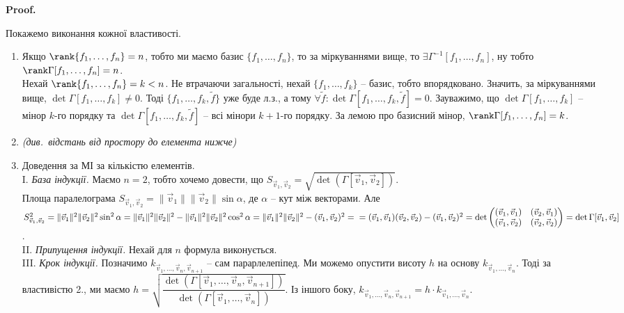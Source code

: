 \documentclass[a4paper, 10pt]{article}
\makeatletter
\theoremstyle{theoremdd}
\renewenvironment{proof}[1][Proof.\\]{\par
\pushQED{\hfill \qed}%
\normalfont \topsep6\p@\@plus6\p@\relax
\trivlist
\item\relax
{\bfseries
#1\@addpunct{.}}\hspace\labelsep\ignorespaces
}{%
\popQED\endtrivlist\@endpefalse
}
\makeatother
\begin{document}
\begin{proof}
Покажемо виконання кожної властивості.
\begin{enumerate}[wide=0pt, label={\arabic*)},topsep=-\parskip]
\item Якщо $\rank\{f_1,\dots,f_n\} = n$, тобто ми маємо базис $\{f_1,\dots,f_n\}$, то за міркуваннями вище, то $\exists \Gamma^{-1}[f_1,\dots,f_n]$, ну тобто $\rank\Gamma[f_1,\dots,f_n] = n$.\\
Нехай $\rank\{f_1,\dots,f_n\} = k < n$. Не втрачаючи загальності, нехай $\{f_1,\dots,f_k\}$ -- базис, тобто впорядковано. Значить, за міркуваннями вище, $\det \Gamma[f_1,\dots,f_k] \neq 0$. Тоді $\{f_1,\dots,f_k,\widetilde{f}\}$ уже буде л.з., а тому $\forall \widetilde{f}: \det \Gamma[f_1,\dots,f_k,\widetilde{f}] = 0$. Зауважимо, що $\det \Gamma[f_1,\dots,f_k]$ -- мінор $k$-го порядку та $\det \Gamma[f_1,\dots,f_k, \widetilde{f}]$ -- всі мінори $k+1$-го порядку. За лемою про базисний мінор, $\rank \Gamma[f_1,\dots,f_n] = k$.
\item \textit{(див.\ відстань від простору до елемента нижче)}
\item Доведення за МІ за кількістю елементів.\\
I. \textit{База індукції.} Маємо $n = 2$, тобто хочемо довести, що $S_{\vec{v}_1,\vec{v}_2} = \sqrt{\det(\Gamma[\vec{v}_1,\vec{v}_2])}$.\\
Площа паралелограма $S_{\vec{v}_1,\vec{v}_2} = \| \vec{v}_1 \| \| \vec{v}_2 \| \sin \alpha$, де $\alpha$ -- кут між векторами. Але\\
$S^2_{\vec{v}_1,\vec{v}_2} = \| \vec{v}_1 \|^2 \| \vec{v}_2 \|^2 \sin^2 \alpha = \| \vec{v}_1 \|^2 \| \vec{v}_2 \|^2 - \| \vec{v}_1 \|^2 \| \vec{v}_2 \|^2 \cos^2 \alpha = \| \vec{v}_1 \|^2 \| \vec{v}_2 \|^2 - (\vec{v}_1,\vec{v}_2)^2 = \\ = (\vec{v}_1,\vec{v}_1) (\vec{v}_2,\vec{v}_2) - (\vec{v}_1,\vec{v}_2)^2 = \det \begin{pmatrix}
(\vec{v}_1,\vec{v}_1) & (\vec{v}_2,\vec{v}_1) \\
(\vec{v}_1,\vec{v}_2) & (\vec{v}_2,\vec{v}_2)
\end{pmatrix} = \det \Gamma[\vec{v}_1,\vec{v}_2]$.
\\
II. \textit{Припущення індукції.} Нехай для $n$ формула виконується. \\
III. \textit{Крок індукції.} Позначимо $k_{\vec{v}_1,\dots,\vec{v}_n,\vec{v}_{n+1}}$ -- сам парарлелепіпед. Ми можемо опустити висоту $h$ на основу $k_{\vec{v}_1,\dots,\vec{v}_n}$. Тоді за властивістю 2., ми маємо $h = \sqrt{\dfrac{\det(\Gamma[\vec{v}_1,\dots,\vec{v}_n,\vec{v}_{n+1}])}{\det(\Gamma[\vec{v}_1,\dots,\vec{v}_n])}}$. Із іншого боку, $k_{\vec{v}_1,\dots,\vec{v}_n,\vec{v}_{n+1}} = h \cdot k_{\vec{v}_1,\dots,\vec{v}_n}$.\\

\end{enumerate}
\end{proof}
\end{document}

